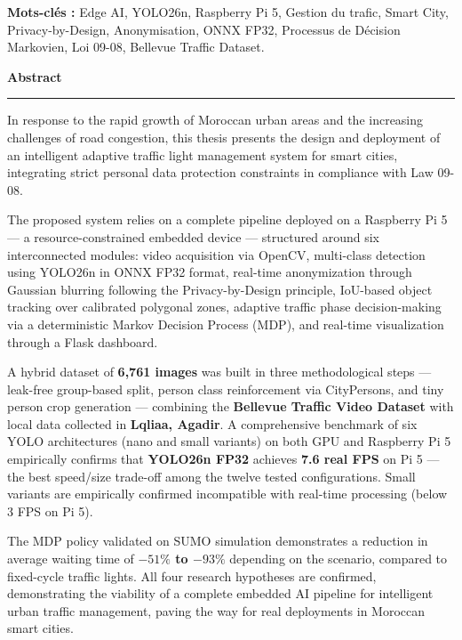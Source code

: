 \vspace{0.4cm}

\begin{tcolorbox}[
  colback  = LightGray,
  colframe = DarkGray,
  arc      = 3pt,
  boxrule  = 0.5pt
]
\textbf{Mots-clés :} Edge AI, YOLO26n, Raspberry Pi 5,
Gestion du trafic, Smart City, Privacy-by-Design,
Anonymisation, ONNX FP32, Processus de Décision Markovien,
Loi 09-08, Bellevue Traffic Dataset.
\end{tcolorbox}

\newpage
\thispagestyle{empty}

\begin{center}
{\Large\bfseries\color{PrimaryBlue} Abstract}
\end{center}
\vspace{0.3cm}
\rule{\linewidth}{0.4pt}
\vspace{0.3cm}

{\normalsize
In response to the rapid growth of Moroccan urban areas and
the increasing challenges of road congestion, this thesis
presents the design and deployment of an intelligent adaptive
traffic light management system for smart cities, integrating
strict personal data protection constraints in compliance
with Law 09-08.

The proposed system relies on a complete pipeline deployed
on a Raspberry Pi 5 — a resource-constrained embedded device
— structured around six interconnected modules: video
acquisition via OpenCV, multi-class detection using YOLO26n
in ONNX FP32 format, real-time anonymization through
Gaussian blurring following the Privacy-by-Design principle,
IoU-based object tracking over calibrated polygonal zones,
adaptive traffic phase decision-making via a deterministic
Markov Decision Process (MDP), and real-time visualization
through a Flask dashboard.

A hybrid dataset of \textbf{6,761 images} was built in
three methodological steps — leak-free group-based split,
person class reinforcement via CityPersons, and tiny
person crop generation — combining the
\textbf{Bellevue Traffic Video Dataset} with local data
collected in \textbf{Lqliaa, Agadir}.
A comprehensive benchmark of six YOLO architectures
(nano and small variants) on both GPU and Raspberry Pi 5
empirically confirms that \textbf{YOLO26n FP32} achieves
\textbf{7.6 real FPS} on Pi 5 — the best speed/size
trade-off among the twelve tested configurations.
Small variants are empirically confirmed incompatible
with real-time processing (below 3 FPS on Pi 5).

The MDP policy validated on SUMO simulation demonstrates
a reduction in average waiting time of
\textbf{$-51\%$ to $-93\%$} depending on the scenario,
compared to fixed-cycle traffic lights.
All four research hypotheses are confirmed, demonstrating
the viability of a complete embedded AI pipeline for
intelligent urban traffic management, paving the way
for real deployments in Moroccan smart cities.
}

